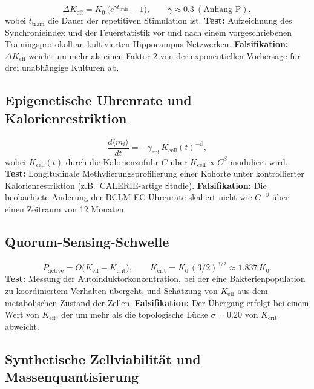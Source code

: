 \documentclass[11pt,a4paper]{article}
\begin{document}
	\begin{equation}\label{eq:pred-neural}
		\Delta K_{\mathrm{eff}} = K_0\,
		\bigl(e^{\gamma t_{\mathrm{train}}}-1\bigr),\qquad
		\gamma \approx 0.3\ (\text{Anhang~P}),
	\end{equation}
	wobei \(t_{\mathrm{train}}\) die Dauer der repetitiven Stimulation ist.
	\textbf{Test:} Aufzeichnung des Synchronieindex und der Feuerstatistik vor und nach einem vorgeschriebenen Trainingsprotokoll an kultivierten Hippocampus-Netzwerken.
	\textbf{Falsifikation:} \(\Delta K_{\mathrm{eff}}\) weicht um mehr als einen Faktor 2 von der exponentiellen Vorhersage für drei unabhängige Kulturen ab.
	
	\subsection{Epigenetische Uhrenrate und Kalorienrestriktion}
	
	\begin{equation}\label{eq:pred-epi}
		\frac{d\langle m_i\rangle}{dt} =
		-\gamma_{\mathrm{epi}}\, K_{\mathrm{cell}}(t)^{-\beta},
	\end{equation}
	wobei \(K_{\mathrm{cell}}(t)\) durch die Kalorienzufuhr \(C\) über
	\(K_{\mathrm{cell}} \propto C^{\beta}\) moduliert wird.
	\textbf{Test:} Longitudinale Methylierungsprofilierung einer Kohorte unter kontrollierter Kalorienrestriktion (z.B.\ CALERIE-artige Studie).
	\textbf{Falsifikation:} Die beobachtete Änderung der BCLM‑EC-Uhrenrate skaliert nicht wie \(C^{-\beta}\) über einen Zeitraum von 12 Monaten.
	
	\subsection{Quorum-Sensing-Schwelle}
	
	\begin{equation}\label{eq:pred-qs}
		P_{\mathrm{active}} =
		\Theta\!\bigl(K_{\mathrm{eff}} - K_{\mathrm{crit}}\bigr),\qquad
		K_{\mathrm{crit}} = K_0\,(3/2)^{3/2} \approx 1.837\,K_0 .
	\end{equation}
	\textbf{Test:} Messung der Autoinduktorkonzentration, bei der eine Bakterienpopulation zu koordiniertem Verhalten übergeht, und Schätzung von \(K_{\mathrm{eff}}\) aus dem metabolischen Zustand der Zellen.
	\textbf{Falsifikation:} Der Übergang erfolgt bei einem Wert von \(K_{\mathrm{eff}}\), der um mehr als die topologische Lücke \(\sigma=0.20\) von \(K_{\mathrm{crit}}\) abweicht.
	
	\subsection{Synthetische Zellviabilität und Massenquantisierung}
	
\end{document}
